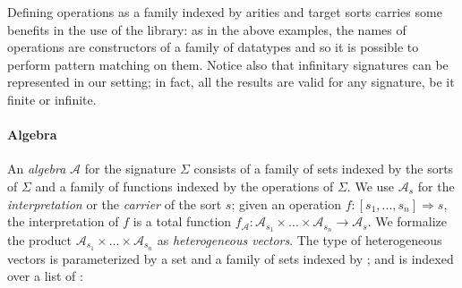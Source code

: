 \noindent Defining operations as a family indexed by arities and
target sorts carries some benefits in the use of the library: as in
the above examples, the names of operations are constructors of a
family of datatypes and so it is possible to perform pattern matching
on them. Notice also that infinitary signatures can be represented in
our setting; in fact, all the results are valid for any signature, be
it finite or infinite.

\paragraph{Algebra}
An \emph{algebra} $\mathcal{A}$ for the signature $\Sigma$ consists of
a family of sets indexed by the sorts of $\Sigma$ and a family of
functions indexed by the operations of $\Sigma$. We use
$\mathcal{A}_s$ for the \emph{interpretation} or the \emph{carrier} of
the sort $s$; given an operation
$f \colon [s_1,...,s_n] \Rightarrow s$, the interpretation of $f$ is a
total function
$f_{\mathcal{A}}\colon \mathcal{A}_{s_1} \times ... \times
\mathcal{A}_{s_n} \rightarrow \mathcal{A}_s$. 
We formalize the product $\mathcal{A}_{s_1} \times ... \times
\mathcal{A}_{s_n}$ as \emph{heterogeneous vectors}. The
type of heterogeneous vectors is parameterized by a set 
and a family of sets indexed by ; and is indexed over a
list of :

\begin{code}
\>[0]\AgdaSpace{}%
\AgdaSpace{}%
\AgdaSymbol{\{}\AgdaSpace{}%
\AgdaSymbol{:}\AgdaSpace{}%
\AgdaSymbol{\}}%
\>[21]\AgdaSymbol{(}\AgdaSpace{}%
\AgdaSymbol{:}\AgdaSpace{}%
\AgdaSpace{}%
\AgdaSpace{}%
\AgdaSymbol{)}\AgdaSpace{}%
\AgdaSymbol{:}\AgdaSpace{}%
\AgdaSpace{}%
\AgdaSpace{}%
\AgdaSpace{}%
\AgdaSpace{}%
\<%
\\
\>[0][@{}l@{\AgdaIndent{0}}]%
\>[2]%
\>[8]\AgdaSymbol{:}%
\>[11]\AgdaSpace{}%
\AgdaSpace{}%
\AgdaInductiveConstructor{[]}\<%
\\
%
\>[2]%
\>[8]\AgdaSymbol{:}%
\>[11]%
\>[14]\AgdaSymbol{\{}\AgdaSpace{}%
\AgdaSymbol{\}}\AgdaSpace{}%
\AgdaSpace{}%
\AgdaSpace{}%
\AgdaSpace{}%
\AgdaSpace{}%
\AgdaSpace{}%
\AgdaSpace{}%
\AgdaSpace{}%
\AgdaSpace{}%
\AgdaSpace{}%
\AgdaSpace{}%
\AgdaSymbol{(}\AgdaSpace{}%
\AgdaSpace{}%
\AgdaSymbol{)}\<%
\end{code}


